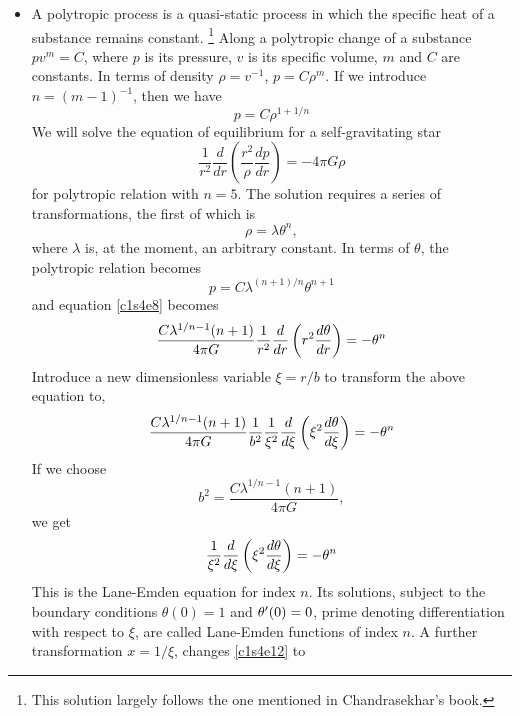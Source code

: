 \begin{itemize}
\item A polytropic process is a quasi-static process in which the specific heat of a substance remains constant\cite{chandrasekhar1958introduction}. \footnote{This solution largely 
follows the one mentioned in Chandrasekhar's book.} Along a polytropic change of a substance $pv^m = C$, where $p$ is its pressure, $v$ is its specific volume, $m$ and $C$ are constants. 
In terms of density $\rho = v^{-1}$, $p = C\rho^{m}$. If we introduce $n = (m - 1)^{-1}$, then we have
\[
p = C\rho^{1 + 1/n}
\]
We will solve the equation of equilibrium for a self-gravitating star
\begin{equation}\label{c1s4e8}
\frac{1}{r^2}\frac{d}{dr}\left(\frac{r^2}{\rho}\frac{dp}{dr}\right) = -4\pi G\rho
\end{equation}
for polytropic relation with $n = 5$. The solution requires a series of transformations, the first of which is 
\begin{equation}\label{c1s4e9}
\rho = \lambda\theta^n,
\end{equation}
where $\lambda$ is, at the moment, an arbitrary constant. In terms of $\theta$, the polytropic relation becomes 
\begin{equation}\label{c1s4e9a}
p = C\lambda^{(n+1)/n}\theta^{n+1}
\end{equation}
and equation \eqref{c1s4e8} becomes
\begin{equation}\label{c1s4e10}
\frac{C\lambda^{1/n - 1}(n + 1)}{4\pi G}\frac{1}{r^2}\frac{d}{dr}\left(r^2\frac{d{\theta}}{d{r}}\right) = -\theta^n
\end{equation}
Introduce a new dimensionless variable $\xi = r/b$ to transform the above equation to,
\[
\frac{C\lambda^{1/n - 1}(n + 1)}{4\pi G}\frac{1}{b^2}\frac{1}{\xi^2}\frac{d}{d\xi}\left(\xi^2\frac{d{\theta}}{d{\xi}}\right) = -\theta^n
\]
If we choose
\begin{equation}\label{c1s4e11}
b^2 = \frac{C\lambda^{1/n - 1}(n + 1)}{4\pi G},
\end{equation}
we get
\begin{equation}\label{c1s4e12}
\frac{1}{\xi^2}\frac{d}{d\xi}\left(\xi^2\frac{d{\theta}}{d{\xi}}\right) = -\theta^n
\end{equation}
This is the Lane-Emden equation for index $n$. Its solutions, subject to the boundary conditions $\theta(0) = 1$ and $\theta^\prime(0) = 0$, prime denoting differentiation with respect to 
$\xi$, are called Lane-Emden functions of index $n$. A further transformation $x = 1/\xi$, changes \eqref{c1s4e12} to
\begin{equation}\label{c1s4e13}

\end{equation}
\end{itemize}
